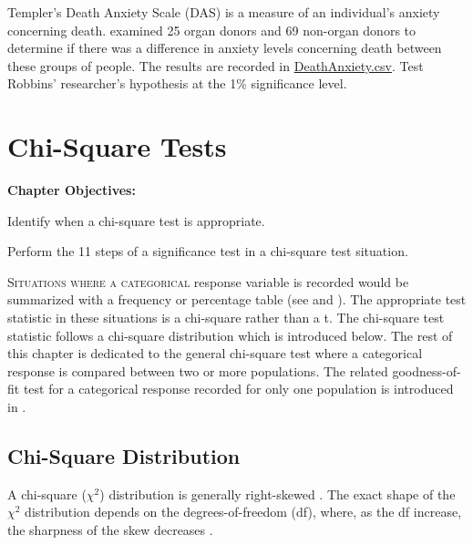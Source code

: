 \documentclass[10pt,openany]{book}\usepackage[]{graphicx}\usepackage[]{color}
\begin{document}
\begin{exsection}
  \item \label{revex:tTestDAS} \rhw{} Templer's Death Anxiety Scale (DAS) is a measure of an individual's anxiety concerning death.  \cite{Robbins1990} examined 25 organ donors and 69 non-organ donors to determine if there was a difference in anxiety levels concerning death between these groups of people.  The results are recorded in \href{https://raw.githubusercontent.com/droglenc/NCData/master/DeathAnxiety.csv}{DeathAnxiety.csv}.  Test Robbins' researcher's hypothesis at the 1\% significance level. 

\end{exsection}



\chapter[Chi-Square Tests]{Chi-Square Tests} \label{chap:ChiSquare}

\begin{ChapObj}{\boxwidth}
  \textbf{Chapter Objectives:}
  \begin{Enumerate}
    \item Identify when a chi-square test is appropriate.
    \item Perform the 11 steps of a significance test in a chi-square test situation.
  \end{Enumerate}
\end{ChapObj}

\minitoc
\newpage

\lettrine{S}{ituations where a categorical} response variable is recorded would be summarized with a frequency or percentage table (see  and ).  The appropriate test statistic in these situations is a chi-square rather than a t.  The chi-square test statistic follows a chi-square distribution which is introduced below.  The rest of this chapter is dedicated to the general chi-square test where a categorical response is compared between two or more populations. The related goodness-of-fit test for a categorical response recorded for only one population is introduced in .

\vspace{-12pt}
\section{Chi-Square Distribution}
\vspace{-12pt}
A chi-square ($\chi^2$) distribution is generally right-skewed .  The exact shape of the $\chi^2$ distribution depends on the degrees-of-freedom (df), where, as the df increase, the sharpness of the skew decreases .
\end{document}
